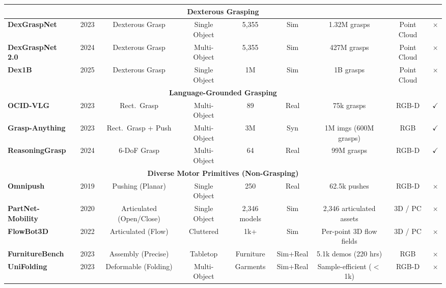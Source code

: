 \documentclass[acmsmall,screen,review,anonymous]{acmart}
\begin{document}
\begin{table}[t]
{\begin{tabular}{l c c c c c c c c}
\midrule
\multicolumn{9}{c}{\textbf{Dexterous Grasping}} \\
\midrule
\textbf{DexGraspNet}~\cite{wang2023dexgraspnetlargescaleroboticdexterous} & 2023 & Dexterous Grasp & Single Object & 5,355 & Sim & 1.32M grasps & Point Cloud & $\times$ \\
\textbf{DexGraspNet 2.0}~\cite{zhang2024dexgraspnet20learninggenerative} & 2024 & Dexterous Grasp & Multi-Object & 5,355 & Sim & 427M grasps & Point Cloud & $\times$ \\
\textbf{Dex1B}~\cite{ye2025dex1b} & 2025 & Dexterous Grasp & Single Object & 1M & Sim & 1B grasps & Point Cloud & $\times$ \\
\midrule
\multicolumn{9}{c}{\textbf{Language-Grounded Grasping}} \\
\midrule
\textbf{OCID-VLG}~\cite{tziafas2023ocidvlg} & 2023 & Rect.\ Grasp & Multi-Object & 89 & Real & 75k grasps & RGB-D & $\checkmark$ \\
\textbf{Grasp-Anything}~\cite{vuong2023graspanything} & 2023 & Rect.\ Grasp + Push & Multi-Object & 3M & Syn & 1M imgs (600M grasps) & RGB & $\checkmark$ \\
\textbf{ReasoningGrasp}~\cite{jin2024reasoninggrasp} & 2024 & 6-DoF Grasp & Multi-Object & 64 & Real & 99M grasps & RGB-D & $\checkmark$ \\
\midrule
\multicolumn{9}{c}{\textbf{Diverse Motor Primitives (Non-Grasping)}} \\
\midrule
\textbf{Omnipush}~\cite{bauza2021omnipush} & 2019 & Pushing (Planar) & Single Object & 250 & Real & 62.5k pushes & RGB-D & $\times$ \\
\textbf{PartNet-Mobility}~\cite{xiang2020sapien} & 2020 & Articulated (Open/Close) & Single Object & 2,346 models & Sim & 2,346 articulated assets & 3D / PC & $\times$ \\
\textbf{FlowBot3D}~\cite{flowbot3d_2022} & 2022 & Articulated (Flow) & Cluttered & 1k+ & Sim & Per-point 3D flow fields & 3D / PC & $\times$ \\
\textbf{FurnitureBench}~\cite{heo2023furniturebench} & 2023 & Assembly (Precise) & Tabletop & Furniture & Sim+Real & 5.1k demos (220 hrs) & RGB & $\times$ \\
\textbf{UniFolding}~\cite{xue2023unifolding} & 2023 & Deformable (Folding) & Multi-Object & Garments & Sim+Real & Sample-efficient ($<$1k) & RGB-D & $\times$ \\
\bottomrule
\end{tabular}
}
\end{table}
\end{document}
